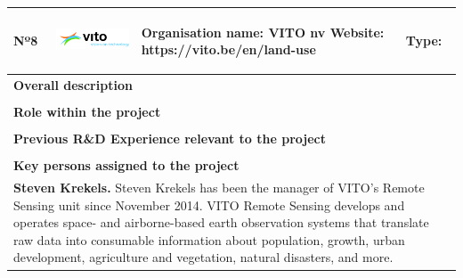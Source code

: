 \begin{longtable}[H]{|p{0.7cm}|p{4cm}|p{7cm}|p{1.3cm}|}
	\hline
	\begin{center} Nº8 \end{center} & \begin{center} \includegraphics[scale=0.35]{./logos/vito-logo} \end{center} & \begin{center} \textbf{Organisation name:} VITO nv \newline \textbf{Website:} https://vito.be/en/land-use \end{center} & \begin{center} Type: \end{center} \\ \hline
	
	\multicolumn{4}{|p{13cm}|}{\textbf{Overall description}}  \\ \hline
	
	\multicolumn{4}{|p{13cm}|}{}  \\ \hline
	
	\multicolumn{4}{|p{13cm}|}{\textbf{Role within the project}}   \\ \hline
	
	\multicolumn{4}{|p{13cm}|}{}  \\ \hline
	
	\multicolumn{4}{|p{13cm}|}{\textbf{Previous R\&D Experience relevant to the project}}  \\ \hline
	
	\multicolumn{4}{|p{13cm}|}{}  \\ \hline
	
	\multicolumn{4}{|p{13cm}|}{\textbf{Key persons assigned to the project}}   \\ \hline
	
	\multicolumn{4}{|p{13cm}|}{\textbf{Steven Krekels.} Steven Krekels has been the manager of VITO’s Remote Sensing unit since November 2014. VITO Remote Sensing develops and operates space- and airborne-based earth observation systems that translate raw data into consumable information about population, growth, urban development, agriculture and vegetation, natural disasters, and more.}  \\ \hline
	

\end{longtable}
